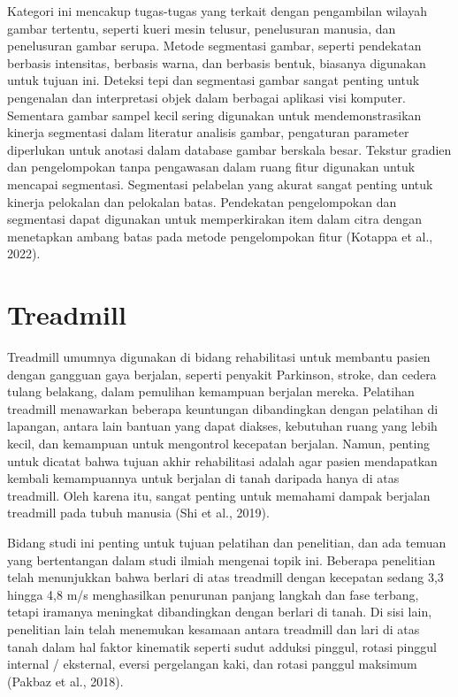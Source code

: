 Kategori ini mencakup tugas-tugas yang terkait dengan pengambilan wilayah gambar tertentu, seperti kueri mesin telusur, penelusuran manusia, dan penelusuran gambar serupa. Metode segmentasi gambar, seperti pendekatan berbasis intensitas, berbasis warna, dan berbasis bentuk, biasanya digunakan untuk tujuan ini. Deteksi tepi dan segmentasi gambar sangat penting untuk pengenalan dan interpretasi objek dalam berbagai aplikasi visi komputer. Sementara gambar sampel kecil sering digunakan untuk mendemonstrasikan kinerja segmentasi dalam literatur analisis gambar, pengaturan parameter diperlukan untuk anotasi dalam database gambar berskala besar. Tekstur gradien dan pengelompokan tanpa pengawasan dalam ruang fitur digunakan untuk mencapai segmentasi. Segmentasi pelabelan yang akurat sangat penting untuk kinerja pelokalan dan pelokalan batas. Pendekatan pengelompokan dan segmentasi dapat digunakan untuk memperkirakan item dalam citra dengan menetapkan ambang batas pada metode pengelompokan fitur (Kotappa  et al., 2022).


\section{Treadmill}
\label{sec:deteksigesturtubuh}

Treadmill umumnya digunakan di bidang rehabilitasi untuk membantu pasien dengan gangguan gaya berjalan, seperti penyakit Parkinson, stroke, dan cedera tulang belakang, dalam pemulihan kemampuan berjalan mereka. Pelatihan treadmill menawarkan beberapa keuntungan dibandingkan dengan pelatihan di lapangan, antara lain bantuan yang dapat diakses, kebutuhan ruang yang lebih kecil, dan kemampuan untuk mengontrol kecepatan berjalan. Namun, penting untuk dicatat bahwa tujuan akhir rehabilitasi adalah agar pasien mendapatkan kembali kemampuannya untuk berjalan di tanah daripada hanya di atas treadmill. Oleh karena itu, sangat penting untuk memahami dampak berjalan treadmill pada tubuh manusia (Shi et al., 2019).

Bidang studi ini penting untuk tujuan pelatihan dan penelitian, dan ada temuan yang bertentangan dalam studi ilmiah mengenai topik ini. Beberapa penelitian telah menunjukkan bahwa berlari di atas treadmill dengan kecepatan sedang 3,3 hingga 4,8 m/s menghasilkan penurunan panjang langkah dan fase terbang, tetapi iramanya meningkat dibandingkan dengan berlari di tanah. Di sisi lain, penelitian lain telah menemukan kesamaan antara treadmill dan lari di atas tanah dalam hal faktor kinematik seperti sudut adduksi pinggul, rotasi pinggul internal / eksternal, eversi pergelangan kaki, dan rotasi panggul maksimum (Pakbaz et al., 2018).

